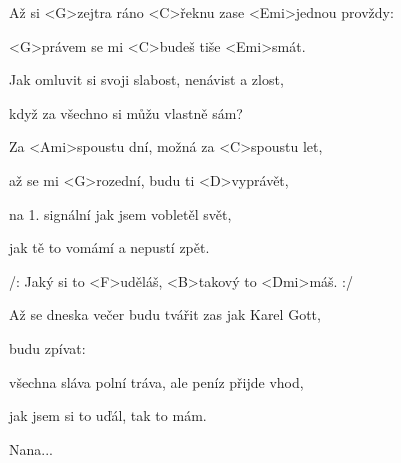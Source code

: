 

\zs
Až si <G>zejtra ráno <C>řeknu zase
<Emi>jednou provždy: 

<G>právem se mi <C>budeš tiše <Emi>smát.

Jak omluvit si svoji slabost, nenávist a zlost,

když za všechno si můžu vlastně sám?
\ks

\zr
Za <Ami>spoustu dní, možná za <C>spoustu let,

až se mi <G>rozední, budu ti <D>vyprávět,

na 1. signální jak jsem vobletěl svět,

jak tě to vomámí a nepustí zpět.

/: Jaký si to <F>uděláš, <B>takový to <Dmi>máš. :/
\kr

\zs
Až se dneska večer budu tvářit zas jak Karel Gott,

budu zpívat: 

všechna sláva polní tráva, ale peníz přijde vhod,

jak jsem si to uďál, tak to mám.
\ks

\zr \kr

Nana...

\kp
